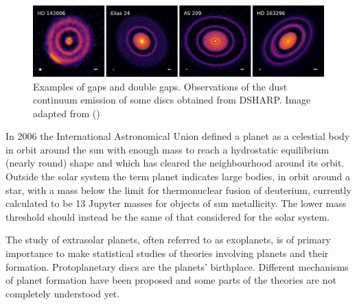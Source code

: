 \documentclass[a4paper,10pt]{report}
\begin{document}
\begin{figure}
    \begin{center}
        \includegraphics[width=\textwidth]{images/alma_pictures.jpg}
    \end{center}
    \caption{Examples of gaps and double gaps. 
    Observations of the dust continuum emission of some discs obtained from DSHARP.
    Image adapted from ()}
\end{figure}

In 2006 the International Astronomical Union defined a planet as a celestial body in orbit around the sun with enough mass 
to reach a hydrostatic equilibrium (nearly round) shape and which has cleared the neighbourhood around its orbit. Outside the solar system 
the term planet indicates large bodies, in orbit around a star,
with a mass below the limit for thermonuclear fusion of deuterium, 
currently calculated to be 13 Jupyter masses for objects of sun metallicity. The lower mass threshold should instead be the same of that considered
for the solar system.

The study of extrasolar planets, often referred to as exoplanets, is of primary importance to make statistical studies of theories 
involving planets and their formation. Protoplanetary discs are the planets' birthplace. 
Different mechanisms of planet formation have been proposed and some parts of the theories are not completely
understood yet. 
\end{document}
